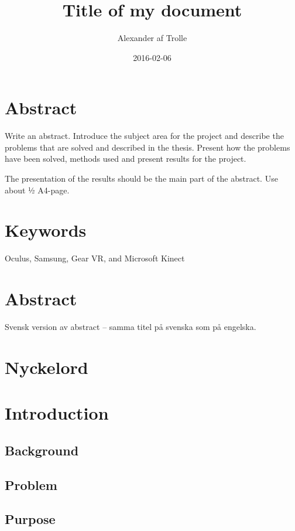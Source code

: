 \documentclass{article}
\title{Title of my document}
\date{2016-02-06}
\author{Alexander af Trolle}
\begin{document}
\maketitle


\newpage
 

\section{Abstract}
Write an abstract. Introduce the subject area for the project and describe the problems that are solved and described in the thesis. Present how the problems have been solved, methods used and present results for the project. 

The presentation of the results should be the main part of the abstract. Use about ½ A4-page.

\section{Keywords}
Oculus, Samsung,  Gear VR, and Microsoft Kinect

\newpage



\section{Abstract}
Svensk version av abstract – samma titel på svenska som på engelska.


\section{Nyckelord}


\newpage

\tableofcontents
\newpage


\section{Introduction}
\subsection{Background}
\subsection{Problem}
\subsection{Purpose}
\end{document}
